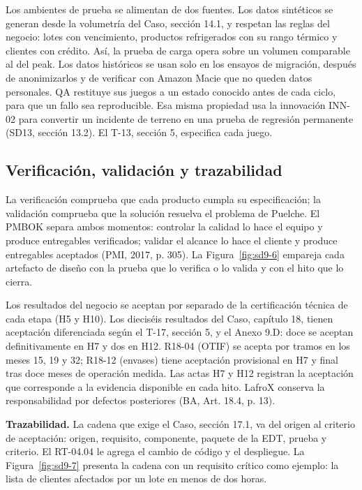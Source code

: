 Los ambientes de prueba se alimentan de dos fuentes. Los datos sintéticos se generan desde la volumetría del Caso, sección 14.1, y respetan las reglas del negocio: lotes con vencimiento, productos refrigerados con su rango térmico y clientes con crédito. Así, la prueba de carga opera sobre un volumen comparable al del peak. Los datos históricos se usan solo en los ensayos de migración, después de anonimizarlos y de verificar con Amazon Macie que no queden datos personales. QA restituye sus juegos a un estado conocido antes de cada ciclo, para que un fallo sea reproducible. Esa misma propiedad usa la innovación INN-02 para convertir un incidente de terreno en una prueba de regresión permanente (SD13, sección 13.2). El T-13, sección 5, especifica cada juego.

\subsection{Verificación, validación y trazabilidad}

La verificación comprueba que cada producto cumpla su especificación; la validación comprueba que la solución resuelva el problema de Puelche. El PMBOK separa ambos momentos: controlar la calidad lo hace el equipo y produce entregables verificados; validar el alcance lo hace el cliente y produce entregables aceptados (PMI, 2017, p. 305). La Figura~\ref{fig:sd9-6} empareja cada artefacto de diseño con la prueba que lo verifica o lo valida y con el hito que lo cierra.


Los resultados del negocio se aceptan por separado de la certificación técnica de cada etapa (H5 y H10). Los dieciséis resultados del Caso, capítulo 18, tienen aceptación diferenciada según el T-17, sección 5, y el Anexo 9.D: doce se aceptan definitivamente en H7 y dos en H12. R18-04 (OTIF) se acepta por tramos en los meses 15, 19 y 32; R18-12 (envases) tiene aceptación provisional en H7 y final tras doce meses de operación medida. Las actas H7 y H12 registran la aceptación que corresponde a la evidencia disponible en cada hito. LafroX conserva la responsabilidad por defectos posteriores (BA, Art. 18.4, p. 13).

\textbf{Trazabilidad.} La cadena que exige el Caso, sección 17.1, va del origen al criterio de aceptación: origen, requisito, componente, paquete de la EDT, prueba y criterio. El RT-04.04 le agrega el cambio de código y el despliegue. La Figura~\ref{fig:sd9-7} presenta la cadena con un requisito crítico como ejemplo: la lista de clientes afectados por un lote en menos de dos horas.

